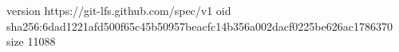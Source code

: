 version https://git-lfs.github.com/spec/v1
oid sha256:6dad1221afd500f65c45b50957beacfc14b356a002dacf0225be626ac1786370
size 11088
